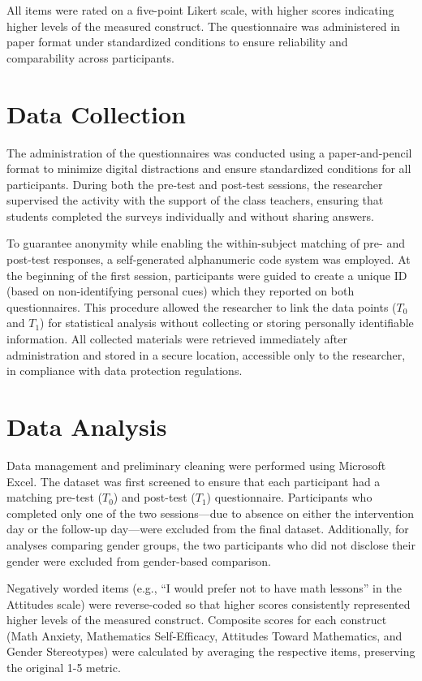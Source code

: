 All items were rated on a five-point Likert scale, with higher scores indicating higher levels of the measured construct. The questionnaire was administered in paper format under standardized conditions to ensure reliability and comparability across participants.


\section{Data Collection}
The administration of the questionnaires was conducted using a paper-and-pencil format to minimize digital distractions and ensure standardized conditions for all participants. During both the pre-test and post-test sessions, the researcher supervised the activity with the support of the class teachers, ensuring that students completed the surveys individually and without sharing answers.

To guarantee anonymity while enabling the within-subject matching of pre- and post-test responses, a self-generated alphanumeric code system was employed. At the beginning of the first session, participants were guided to create a unique ID (based on non-identifying personal cues) which they reported on both questionnaires. This procedure allowed the researcher to link the data points ($T_0$ and $T_1$) for statistical analysis without collecting or storing personally identifiable information.
All collected materials were retrieved immediately after administration and stored in a secure location, accessible only to the researcher, in compliance with data protection regulations.


\section{Data Analysis}

Data management and preliminary cleaning were performed using Microsoft Excel. The dataset was first screened to ensure that each participant had a matching pre-test ($T_0$) and post-test ($T_1$) questionnaire. Participants who completed only one of the two sessions—due to absence on either the intervention day or the follow-up day—were excluded from the final dataset. Additionally, for analyses comparing gender groups, the two participants who did not disclose their gender were excluded from gender-based comparison.

Negatively worded items (e.g., “I would prefer not to have math lessons” in the Attitudes scale) were reverse-coded so that higher scores consistently represented higher levels of the measured construct. Composite scores for each construct (Math Anxiety, Mathematics Self-Efficacy, Attitudes Toward Mathematics, and Gender Stereotypes) were calculated by averaging the respective items, preserving the original 1-5 metric.

